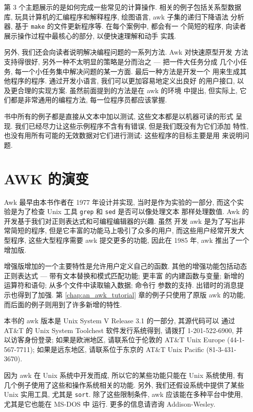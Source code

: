 第 3 个主题展示的是如何完成一些常见的计算操作. 相关的例子包括关系型数据
库, 玩具计算机的汇编程序和解释程序, 绘图语言, awk 子集的递归下降语法
分析器, 基于 \texttt{make} 的文件更新程序等. 在每个案例中, 都会有一
个简短的程序, 向读者展示操作过程中最核心的部分, 以便快速理解和动手
实践.

另外, 我们还会向读者说明解决编程问题的一系列方法. Awk 对快速原型开发
方法支持得很好, 另外一种不太明显的策略是分而治之 --- 把一件大任务分成
几个小任务, 每一个小任务集中解决问题的某一方面. 最后一种方法是开发一个
用来生成其他程序的程序. 通过开发小语言, 我们可以更加容易地定义出良好
的用户接口, 以及更合理的实现方案. 虽然前面提到的方法是在 awk 的环境
中提出, 但实际上, 它们都是非常通用的编程方法, 每一位程序员都应该掌握.

书中所有的例子都是直接从文本中加以测试, 这些文本都是以机器可读的形式
呈现. 我们已经尽力让这些示例程序不含有有错误, 但是我们既没有为它们添加
特性, 也没有用所有可能的无效数据对它们进行测试: 这些程序的目标主要是用
来说明问题.

\section*{AWK 的演变}

Awk 最早由本书作者在 1977 年设计并实现, 当时是作为实验的一部分, 而这个实
验是为了检查 Unix 工具 \texttt{grep} 和 \texttt{sed} 是否可以像处理文本
那样处理数值. Awk 的开发基于我们对正则表达式和可编程编辑器的兴趣. 虽然 
开发 awk 是为了写出非常简短的程序, 但是它丰富的功能马上吸引了众多的用户,
而这些用户经常开发大型程序, 这些大型程序需要 awk 提交更多的功能, 因此在
1985 年, awk 推出了一个增加版.

增强版增加的一个主要特性是允许用户定义自己的函数.
其他的增强功能包括动态正则表达式 --- 带有文本替换和模式匹配功能; 更丰富
的内建函数与变量; 新增的运算符和语句; 从多个文件中读取输入数据; 命令行 
参数的支持. 出错时的消息提示也得到了加强. 第 \ref{chap:an_awk_tutorial}
章的例子只使用了原版 awk 的功能, 而后面的例子则用到了许多新增的特性.

本书的 awk 版本是 Unix System V Release 3.1 的一部分, 其源代码可以
通过 AT\&T 的 Unix System Toolchest 软件发行系统得到, 请拨打 
1-201-522-6900, 并以访客身份登录; 如果是欧洲地区, 请联系位于伦敦的 AT\&T
Unix Europe (44-1-567-7711); 如果是远东地区, 请联系位于东京的
AT\&T Unix Pacific (81-3-431-3670).

因为 awk 在 Unix 系统中开发而成, 所以它的某些功能只能在 Unix 系统使用,
有几个例子使用了这些和操作系统相关的功能.
另外, 我们还假设系统中提供了某些 Unix 实用工具, 尤其是  \texttt{sort}.
除了这些限制条件, awk 应该能在多种平台中使用, 尤其是它也能在 MS-DOS 中
运行. 更多的信息请咨询 Addison-Wesley.

